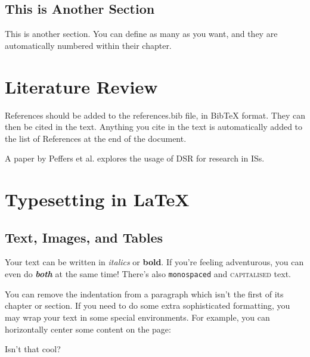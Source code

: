 \documentclass[12pt,reqno,twoside]{amsbook}
\begin{document}
\section{This is Another Section}

This is another section. You can define as many as you want, and they are automatically numbered within their chapter.










\chapter{Literature Review}\label{ch:literature_review}

References should be added to the references.bib file, in BibTeX format. They can then be cited in the text. Anything you cite in the text is automatically added to the list of References at the end of the document.

A paper by Peffers et al. \cite{Peffers2007} explores the usage of \ac{DSR} for research in \acp{IS}.










\chapter{Typesetting in \LaTeX}\label{ch:typesetting}

\section{Text, Images, and Tables}\label{sec:text_images_tables}

Your text can be written in \textit{italics} or \textbf{bold}. If you're feeling adventurous, you can even do \textit{\textbf{both}} at the same time! There's also \texttt{monospaced} and \textsc{capitalised} text.

\noindent You can remove the indentation from a paragraph which isn't the first of its chapter or section. If you need to do some extra sophisticated formatting, you may wrap your text in some special environments. For example, you can horizontally center some content on the page:
\begin{center}
    Isn't that cool?
\end{center}
\end{document}
